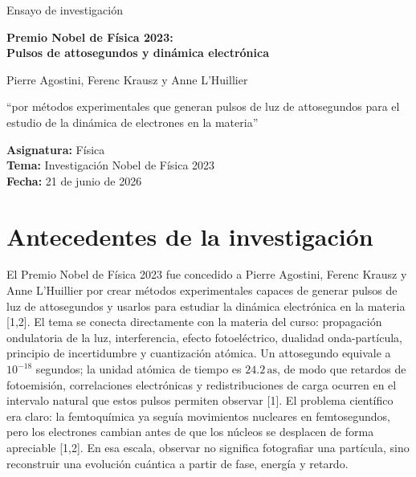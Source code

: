 \documentclass[12pt]{article}
\newcommand{\as}{\mathrm{as}}
\begin{document}
\begin{titlepage}
\centering
\vspace*{1.1in}
{\Large Ensayo de investigación\par}
\vspace{0.35in}
{\huge\bfseries Premio Nobel de Física 2023:\\
Pulsos de attosegundos y dinámica electrónica\par}
\vspace{0.45in}
{\Large Pierre Agostini, Ferenc Krausz y Anne L'Huillier\par}
\vspace{0.35in}
{\large ``por métodos experimentales que generan pulsos de luz de attosegundos para el estudio de la dinámica de electrones en la materia''\par}
\vfill
\begin{flushleft}
\textbf{Asignatura:} Física\\
\textbf{Tema:} Investigación Nobel de Física 2023\\
\textbf{Fecha:} 21 de junio de 2026
\end{flushleft}
\end{titlepage}

\newpage
{}
\setcounter{page}{2}

\section*{Antecedentes de la investigación}

El Premio Nobel de Física 2023 fue concedido a Pierre Agostini, Ferenc Krausz y Anne L'Huillier por crear métodos experimentales capaces de generar pulsos de luz de attosegundos y usarlos para estudiar la dinámica electrónica en la materia [1,2]. El tema se conecta directamente con la materia del curso: propagación ondulatoria de la luz, interferencia, efecto fotoeléctrico, dualidad onda-partícula, principio de incertidumbre y cuantización atómica. Un attosegundo equivale a $10^{-18}$ segundos; la unidad atómica de tiempo es $24.2\,\as$, de modo que retardos de fotoemisión, correlaciones electrónicas y redistribuciones de carga ocurren en el intervalo natural que estos pulsos permiten observar [1]. El problema científico era claro: la femtoquímica ya seguía movimientos nucleares en femtosegundos, pero los electrones cambian antes de que los núcleos se desplacen de forma apreciable [1,2]. En esa escala, observar no significa fotografiar una partícula, sino reconstruir una evolución cuántica a partir de fase, energía y retardo.
\end{document}
